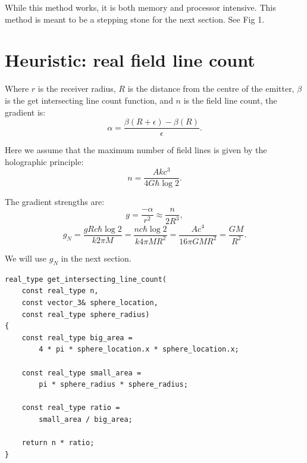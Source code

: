 \documentclass[12pt]{article}
\begin{document}
While this method works, it is both memory and processor intensive.
This method is meant to be a stepping stone for the next section.
See Fig 1.


\section{Heuristic: real field line count}

Where $r$ is the receiver radius, $R$ is the distance from the centre of the emitter, $\beta$ is the get intersecting line count function, and $n$ is the field line count, the gradient is:
\begin{equation}
\alpha = \frac{\beta(R + \epsilon) - \beta(R)}{\epsilon}.
\end{equation}

Here we assume that the maximum number of field lines is given by the holographic principle:
\begin{equation}
n = \frac{A k c^3}{ 4 G \hbar \log 2}.
\end{equation}

The gradient strengths are:
\begin{equation}
g = \frac{-\alpha}{r^2} \approx \frac{n}{2 R^3},
\end{equation}
\begin{equation}
\label{g_N_equation}
g_N = \frac{g R c \hbar \log 2}{k 2 \pi M} = \frac{n c \hbar \log 2}{k 4 \pi M R^2} = \frac{A c^4}{16 \pi G M R^2} = \frac{G M}{R^2}.
\end{equation}

We will use $g_N$ in the next section.

\begin{lstlisting}
real_type get_intersecting_line_count(
	const real_type n,
	const vector_3& sphere_location,
	const real_type sphere_radius)
{
	const real_type big_area = 
		4 * pi * sphere_location.x * sphere_location.x;

	const real_type small_area = 
		pi * sphere_radius * sphere_radius;
	
	const real_type ratio = 
		small_area / big_area;
	
	return n * ratio;
}
\end{lstlisting}
\end{document}
